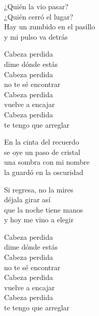 \begin{lyrics}
¿Quién la vio pasar?\\
¿Quién cerró el lugar?\\
Hay un zumbido en el pasillo\\
y mi pulso va detrás

Cabeza perdida\\
dime dónde estás\\
Cabeza perdida\\
no te sé encontrar\\
Cabeza perdida\\
vuelve a encajar\\
Cabeza perdida\\
te tengo que arreglar

En la cinta del recuerdo\\
se oye un paso de cristal\\
una sombra con mi nombre\\
la guardó en la oscuridad

Si regresa, no la mires\\
déjala girar así\\
que la noche tiene manos\\
y hoy me vino a elegir

Cabeza perdida\\
dime dónde estás\\
Cabeza perdida\\
no te sé encontrar\\
Cabeza perdida\\
vuelve a encajar\\
Cabeza perdida\\
te tengo que arreglar
\end{lyrics}

